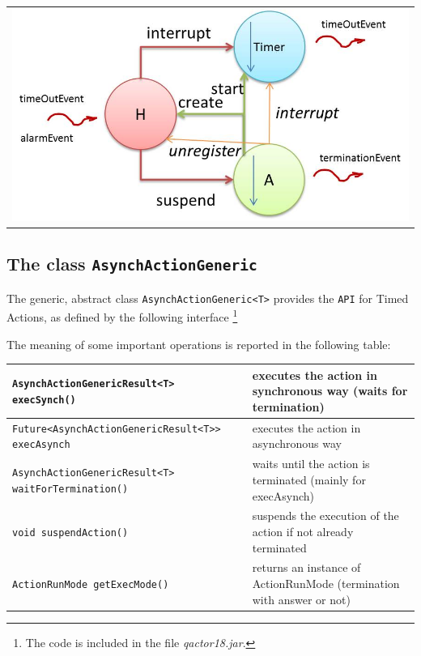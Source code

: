 \begin{center}
\begin{tabular}{ c }
     \includegraphics[scale = 0.5]{img/actionTimedReactive.jpg}\\
\end{tabular}{   }
\end{center}




\subsection{The class \texttt{AsynchActionGeneric}}

The generic, abstract class \texttt{AsynchActionGeneric<T>} provides the \texttt{API} for Timed Actions, as defined by the following interface \footnote{The code is included in the file \textit{qactor18.jar}.}  



The meaning of some important operations is reported in the following table:

\medskip 
\noindent
\begin{scriptsize}
\begin{tabular}{|l|l|}
\hline 
\texttt{AsynchActionGenericResult<T> execSynch()} & executes the action in synchronous way (waits for termination) \\ 
\hline 
\texttt{Future<AsynchActionGenericResult<T>> execAsynch} & executes the action in asynchronous way \\ 
\hline 
\texttt{AsynchActionGenericResult<T> waitForTermination()} & waits until the action is terminated (mainly for execAsynch) \\ 
\hline 
\texttt{void suspendAction()} & suspends the execution of the action if not already terminated \\ 
\hline 
\texttt{ActionRunMode getExecMode()} & returns an instance of ActionRunMode (termination with answer or not) \\  
\hline 
\end{tabular} 
\end{scriptsize}  

